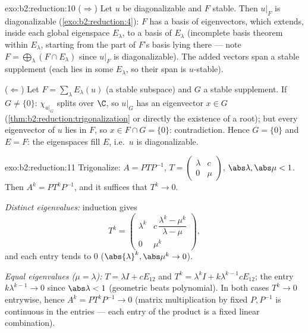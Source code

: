 \begin{solution}{exo:b2:reduction:10}
($\Rightarrow$) Let $u$ be diagonalizable and $F$ stable. Then
$u|_F$ is diagonalizable (\cref{exo:b2:reduction:4}): $F$ has a
basis of eigenvectors, which extends, inside each global eigenspace
$E_\lambda$, to a basis of $E_\lambda$ (incomplete basis theorem
within $E_\lambda$, starting from the part of $F$'s basis lying
there --- note $F = \bigoplus_\lambda (F \cap E_\lambda)$ since
$u|_F$ is diagonalizable). The added vectors span a stable
supplement (each lies in some $E_\lambda$, so their span is
$u$-stable).

($\Leftarrow$) Let $F = \sum_\lambda E_\lambda(u)$ (a stable
subspace) and $G$ a stable supplement. If $G \neq \{0\}$: $\chi_{u|_G}$
splits over $\C$, so $u|_G$ has an eigenvector $x \in G$
(\cref{thm:b2:reduction:trigonalization} or directly the existence
of a root); but every eigenvector of $u$ lies in $F$, so $x \in F
\cap G = \{0\}$: contradiction. Hence $G = \{0\}$ and $E = F$: the
eigenspaces fill $E$, i.e.\ $u$ is diagonalizable.
\end{solution}

\begin{solution}{exo:b2:reduction:11}
Trigonalize: $A = PTP^{-1}$, $T = \begin{pmatrix} \lambda & c\\ 0 &
\mu\end{pmatrix}$, $\abs\lambda, \abs\mu < 1$. Then $A^k =
PT^kP^{-1}$, and it suffices that $T^k \to 0$.

\emph{Distinct eigenvalues:} induction gives
\[
T^k = \begin{pmatrix}
\lambda^k & c\,\dfrac{\lambda^k - \mu^k}{\lambda - \mu}\\[4pt]
0 & \mu^k
\end{pmatrix},
\]
and each entry tends to $0$ ($\abs{\lambda}^k, \abs\mu^k \to 0$).

\emph{Equal eigenvalues ($\mu = \lambda$):} $T = \lambda I + cE_{12}$
and $T^k = \lambda^k I + k\lambda^{k-1}cE_{12}$; the entry
$k\lambda^{k-1} \to 0$ since $\abs\lambda < 1$ (geometric beats
polynomial). In both cases $T^k \to 0$ entrywise, hence $A^k =
PT^kP^{-1} \to 0$ (matrix multiplication by fixed $P, P^{-1}$ is
continuous in the entries --- each entry of the product is a fixed
linear combination).
\end{solution}

